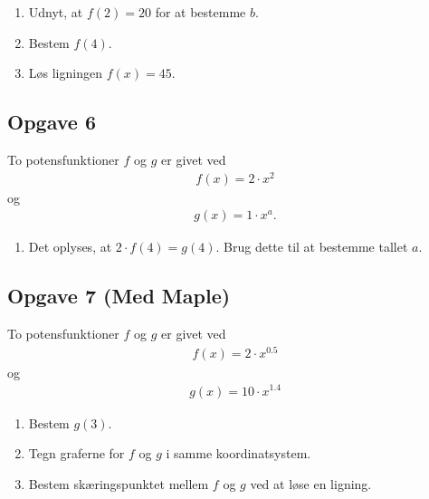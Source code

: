 \begin{enumerate}[label = \roman*)]
	\item Udnyt, at $f(2) = 20$ for at bestemme $b$. 
	\item Bestem $f(4)$.
	\item Løs ligningen $f(x) = 45$.
\end{enumerate}

\subsection*{Opgave 6}
To potensfunktioner $f$ og $g$ er givet ved
\begin{align*}
	f(x) = 2 \cdot x^{2}
\end{align*}
og 
\begin{align*}
	g(x) = 1 \cdot x^{a}.
\end{align*}

\begin{enumerate}[label=\roman*)]
	\item Det oplyses, at $2\cdot f(4) = g(4)$. Brug dette til at bestemme tallet $a$.  
\end{enumerate}



\subsection*{Opgave 7 (Med Maple)}
To potensfunktioner $f$ og $g$ er givet ved
\begin{align*}
	f(x) = 2\cdot x^{0.5}
\end{align*}
og 
\begin{align*}
	g(x) = 10 \cdot x^{1.4}
\end{align*}

\begin{enumerate}[label=\roman*)]
	\item Bestem $g(3)$.
	\item Tegn graferne for $f$ og $g$ i samme koordinatsystem.
	\item Bestem skæringspunktet mellem $f$ og $g$ ved at løse en ligning. 
\end{enumerate}




